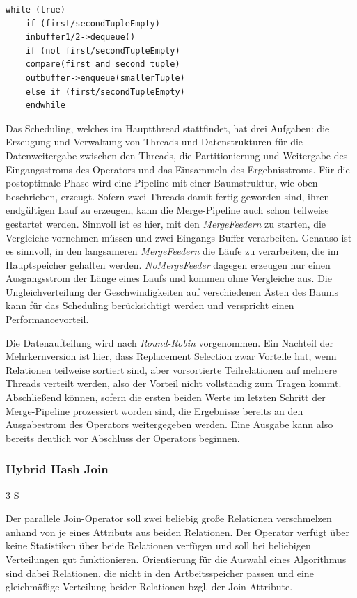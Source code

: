 \documentclass[a4paper,12pt,twoside]{article}
\newcommand{\Fb}[1]{\textit{#1}} %
\begin{document}
\begin{minipage}{\linewidth}
	\begin{lstlisting}[caption={Fastsort: Merge in Pipeline}, label=list:fastsortMerge] 
	while (true)
	if (first/secondTupleEmpty)
	inbuffer1/2->dequeue()
	if (not first/secondTupleEmpty)
	compare(first and second tuple)
	outbuffer->enqueue(smallerTuple)
	else if (first/secondTupleEmpty)
	endwhile
	\end{lstlisting}
\end{minipage}

Das Scheduling, welches im Hauptthread stattfindet, hat drei Aufgaben: die Erzeugung und Verwaltung von Threads und Datenstrukturen für die Datenweitergabe zwischen den Threads, die Partitionierung und Weitergabe des Eingangsstroms des Operators und das Einsammeln des Ergebnisstroms. Für die postoptimale Phase wird eine Pipeline mit einer Baumstruktur, wie oben beschrieben, erzeugt. Sofern zwei Threads damit fertig geworden sind, ihren endgültigen Lauf zu erzeugen, kann die Merge-Pipeline auch schon teilweise gestartet werden. Sinnvoll ist es hier, mit den \Fb{MergeFeedern} zu starten, die Vergleiche vornehmen müssen und zwei Eingangs-Buffer verarbeiten. Genauso ist es sinnvoll, in den langsameren \Fb{MergeFeedern} die Läufe zu verarbeiten, die im Hauptspeicher gehalten werden. \Fb{NoMergeFeeder} dagegen erzeugen nur einen Ausgangsstrom der Länge eines Laufs und kommen ohne Vergleiche aus. Die Ungleichverteilung der Geschwindigkeiten auf verschiedenen Ästen des Baums kann für das Scheduling berücksichtigt werden und verspricht einen Performancevorteil.

Die Datenaufteilung wird nach \Fb{Round-Robin} vorgenommen. Ein Nachteil der Mehrkernversion ist hier, dass Replacement Selection zwar Vorteile hat, wenn Relationen teilweise sortiert sind, aber vorsortierte Teilrelationen auf mehrere Threads verteilt werden, also der Vorteil nicht vollständig zum Tragen kommt. Abschließend können, sofern die ersten beiden Werte im letzten Schritt der Merge-Pipeline prozessiert worden sind, die Ergebnisse bereits an den Ausgabestrom des Operators weitergegeben werden. Eine Ausgabe kann also bereits deutlich vor Abschluss der Operators beginnen.

\subsubsection{Hybrid Hash Join} 3 S
\label{entw:hash}

Der parallele Join-Operator soll zwei beliebig große Relationen verschmelzen anhand von je eines Attributs aus beiden Relationen. Der Operator verfügt über keine Statistiken über beide Relationen verfügen und soll bei beliebigen Verteilungen gut funktionieren. Orientierung für die Auswahl eines Algorithmus sind dabei Relationen, die nicht in den Artbeitsspeicher passen und eine gleichmäßige Verteilung beider Relationen bzgl. der Join-Attribute.
\end{document}
